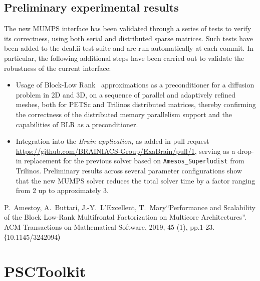 \documentclass[a4paper,12pt]{article}
\begin{document}
\subsection{Preliminary experimental results}
The new MUMPS interface has been validated through a series of tests
to verify its correctness, using both serial and distributed sparse matrices. Such tests
have been added to the deal.ii test-suite and are run automatically at
each commit. In particular, the following additional steps have
been carried out to validate the robustness of the current interface:
\begin{itemize}
    \item Usage of Block-Low Rank~\cite{blr} approximations as a preconditioner
          for a diffusion problem in 2D and 3D, on a sequence of parallel and
          adaptively refined meshes, both for PETSc and Trilinos distributed matrices, thereby
          confirming the correctness of the distributed memory parallelism
          support and the capabilities of BLR as a preconditioner.
    \item Integration into the \emph{Brain application}, as added
          in pull request \url{https://github.com/BRAINIACS-Group/ExaBrain/pull/1}, serving as a
          drop-in replacement for the previous solver based on \texttt{Amesos\_Superludist}
          from Trilinos. Preliminary results across several
          parameter configurations show that the new MUMPS solver
          reduces the total solver time by a factor
          ranging from 2 up to approximately 3.

\end{itemize}



\begin{thebibliography}{10}
     P.~Amestoy, A.~Buttari, J.-Y.~L'Excellent,
    T.~Mary``Performance and Scalability of the Block Low-Rank
    Multifrontal Factorization on Multicore Architectures''. ACM
    Transactions on Mathematical Software, 2019, 45 (1),
    pp.1-23. ⟨10.1145/3242094⟩
\end{thebibliography}



\newpage

\section{PSCToolkit}
\label{sec:section3}
\end{document}
